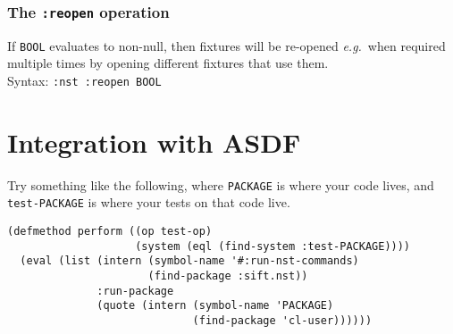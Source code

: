 \documentclass{article}
\begin{document}
\subsubsection{The \texttt{:reopen} operation}
%
If \texttt{BOOL} evaluates to non-null, then fixtures will be
re-opened \emph{e.g.}\ when required multiple times by opening
different fixtures that use them.
\\ Syntax: \texttt{:nst :reopen BOOL}

%

\section{Integration with ASDF}
Try something like the following, where \texttt{PACKAGE} is where
your code lives, and \texttt{test-PACKAGE} is where your tests on that
code live.
\begin{verbatim}
(defmethod perform ((op test-op)
                    (system (eql (find-system :test-PACKAGE))))
  (eval (list (intern (symbol-name '#:run-nst-commands)
                      (find-package :sift.nst))
              :run-package
              (quote (intern (symbol-name 'PACKAGE)
                             (find-package 'cl-user))))))
\end{verbatim}
\end{document}
